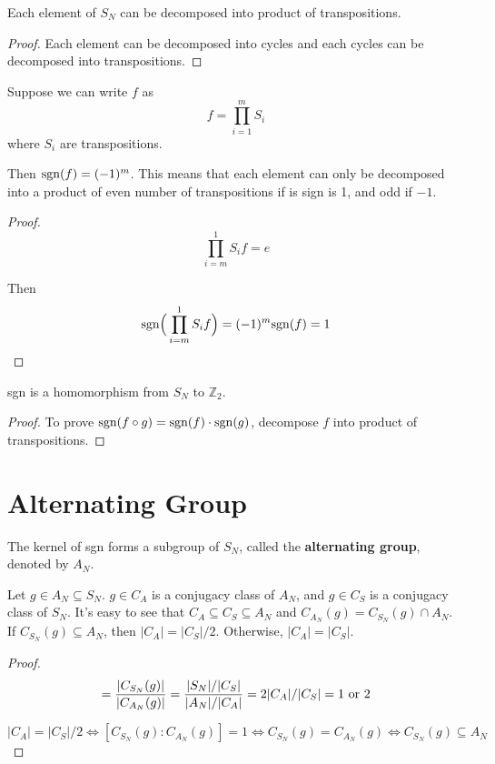 \documentclass[12pt]{book}
\begin{document}
	\begin{lemma}
		Each element of $S_N$ can be decomposed into product of transpositions.
	\end{lemma}
	\begin{proof}
		Each element can be decomposed into cycles and each cycles can be decomposed into transpositions.
	\end{proof}
\begin{lemma}
	Suppose we can write $f$ as
	\begin{equation}
		f=\prod_{i=1}^mS_i
	\end{equation}
	where $S_i$ are transpositions. 
	
	Then ${\rm sgn}(f)=(-1)^m$. This means that each element can only be decomposed into a product of even number of transpositions if is sign is 1, and odd if $-1$.
\end{lemma}
\begin{proof}
	\begin{equation}
		\prod_{i=m}^1S_if=e
	\end{equation}
	
	Then
	\begin{equation}
		{\rm sgn}\Big(\prod_{i=m}^1S_if\Big)=(-1)^m{\rm sgn}(f)=1
	\end{equation}
\end{proof}
	\begin{lemma}
		sgn is a homomorphism from $S_N$ to $\mathbb Z_2$.
	\end{lemma}
	\begin{proof}
		To prove ${\rm sgn}(f\circ g)={\rm sgn}(f)\cdot{\rm sgn}(g)$, decompose $f$ into product of transpositions.
	\end{proof}
	
\section{Alternating Group}
\begin{definition}
	The kernel of sgn forms a subgroup of $S_N$, called the \textbf{alternating group}, denoted by $A_N$.
\end{definition}
	
	\begin{theorem}
		Let $g\in A_N\subseteq S_N$. $g\in C_A$ is a conjugacy class of $A_N$, and $g\in C_S$ is a conjugacy class of $S_N$. It's easy to see that $C_A\subseteq C_S\subseteq A_N$ and $C_{A_N}(g)=C_{S_N}(g)\cap A_N$. If $C_{S_N}(g)\subseteq A_N$, then $|C_A|=|C_S|/2$. Otherwise, $|C_A|=|C_S|$.
	\end{theorem}
	\begin{proof}
		\begin{equation}
			[C_{S_N}(g):C_{A_N}(g)]=\frac{|C_{S_N}(g)|}{|C_{A_N}(g)|}=\frac{|S_N|/|C_S|}{|A_N|/|C_A|}=2|C_A|/|C_S|= 1\ {\rm or}\ 2
		\end{equation}
		
		\begin{equation}
			|C_A|=|C_S|/2\Leftrightarrow[C_{S_N}(g):C_{A_N}(g)]=1\Leftrightarrow C_{S_N}(g)=C_{A_N}(g)\Leftrightarrow C_{S_N}(g)\subseteq A_N
		\end{equation}
	\end{proof}
	
\end{document}
